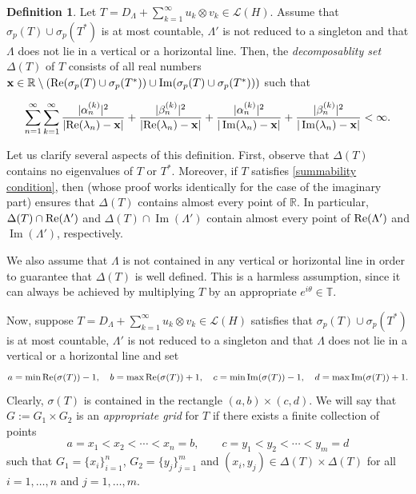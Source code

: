 \documentclass[11pt]{amsart}
\theoremstyle{definition}
\newtheorem{definition}[theorem]{Definition}
\theoremstyle{remark}
\numberwithin{equation}{section}
\DeclareMathOperator*{\Impart}{Im}
\newcommand{\EL}{\mathcal{L}}
\newcommand{\PR}{\textnormal{Re}}
\newcommand{\al}{\alpha}
\newcommand{\sumn}{\sum_{n=1}^{\infty}}
\newcommand{\sumk}{\sum_{k=1}^{\infty}}
\newcommand{\R}{\mathbb{R}}
\newcommand{\x}{\textnormal{\textbf{x}} }
\begin{document}
	
	\begin{definition}\label{definition decomposability set}
		Let $T=D_\Lambda + \sumk u_k\otimes v_k \in \EL(H)$. Assume that $\sigma_p(T)\cup \sigma_p(T^*)$ is at most countable, $\Lambda'$ is not reduced to a singleton and that $\Lambda$ does not lie in a vertical or a horizontal line. Then, the \textit{decomposablity set} $\Delta(T)$ of $T$ consists of all real numbers $\x \in \R \setminus ( \PR(\sigma_p(T)\cup\sigma_p(T^*))\cup \Impart(\sigma_p(T)\cup\sigma_p(T^*)))$ such that
		
		$$ \sumn \sumk \frac{|\al_n^{(k)}|^2}{|\PR(\lambda_n)-\x|} +\frac{|\beta_n^{(k)}|^2}{|\PR(\lambda_n)-\x|} + \frac{|\al_n^{(k)}|^2}{|\Impart(\lambda_n)-\x|} +\frac{|\beta_n^{(k)}|^2}{|\Impart(\lambda_n)-\x|} < \infty. $$
	\end{definition}

Let us clarify several aspects of this definition. First, observe that $\Delta(T)$ contains no eigenvalues of $T$ or $T^*$. Moreover, if $T$ satisfies \eqref{summability condition}, then \cite[Lemma 2.3]{GG3} (whose proof works identically for the case of the imaginary part) ensures that $\Delta(T)$ contains almost every point of $\mathbb{R}$. In particular, $\Delta(T)\cap \PR(\Lambda')$ and $\Delta(T)\cap \Impart(\Lambda')$ contain almost every point of $\PR(\Lambda')$ and $\Impart(\Lambda')$, respectively.

\smallskip

We also assume that $\Lambda$ is not contained in any vertical or horizontal line in order to guarantee that $\Delta(T)$ is well defined. This is a harmless assumption, since it can always be achieved by multiplying $T$ by an appropriate $e^{i\theta}\in \mathbb{T}$.	
	
\medskip


Now, suppose $T=D_\Lambda + \sumk u_k\otimes v_k \in \EL(H)$ satisfies that $\sigma_p(T)\cup \sigma_p(T^*)$ is at most countable, $\Lambda'$ is not reduced to a singleton and that $\Lambda$ does not lie in a vertical or a horizontal line and set
$$
a= \min \PR(\sigma(T))-1, \quad b= \max \PR(\sigma(T))+1, \quad
c= \min \Impart(\sigma(T))-1, \quad d= \max \Impart(\sigma(T))+1.
$$
Clearly,  $\sigma(T)$ is contained in the rectangle $(a,b)\times (c,d)$. We will say that $G:=G_1\times G_2$ is an \textit{appropriate grid}  for $T$ if there exists a finite collection of points
$$
a= x_1 < x_2 < \cdots < x_n = b, \qquad
c= y_1 < y_2 < \cdots < y_m = d
$$
such that $G_1=\{x_i\}_{i=1}^n$, $G_2=\{y_j\}_{j=1}^m$ and $(x_i,y_j) \in \Delta(T)\times\Delta(T)$ for all
$i=1,\ldots,n$ and $j=1,\ldots,m$.
\end{document}
